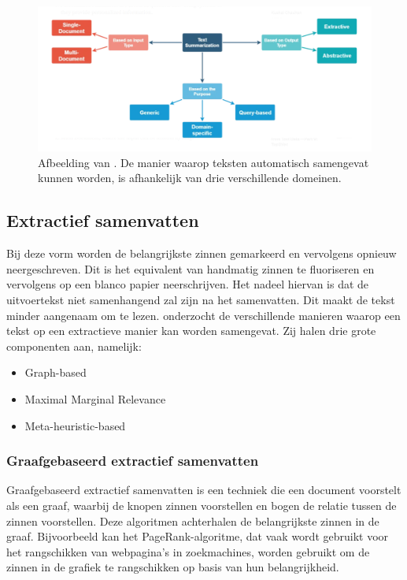 \begin{figure}
	\includegraphics{img/summarization-mindmap.png}
	\caption{Afbeelding van \textcite{Chauchan2018}. De manier waarop teksten automatisch samengevat kunnen worden, is afhankelijk van drie verschillende domeinen.}
\end{figure}

\subsection{Extractief samenvatten}


Bij deze vorm worden de belangrijkste zinnen gemarkeerd en vervolgens opnieuw neergeschreven.  Dit is het equivalent van handmatig zinnen te fluoriseren en vervolgens op een blanco papier neerschrijven. Het nadeel hiervan is dat de uitvoertekst niet samenhangend zal zijn na het samenvatten. Dit maakt de tekst minder aangenaam om te lezen. \textcite{Verma2020} onderzocht de verschillende manieren waarop een tekst op een extractieve manier kan worden samengevat. Zij halen drie grote componenten aan, namelijk:

\begin{itemize}
	\item Graph-based
	\item Maximal Marginal Relevance
	\item Meta-heuristic-based
\end{itemize}

\subsubsection{Graafgebaseerd extractief samenvatten}

Graafgebaseerd extractief samenvatten is een techniek die een document voorstelt als een graaf, waarbij de knopen zinnen voorstellen en bogen de relatie tussen de zinnen voorstellen. Deze algoritmen achterhalen de belangrijkste zinnen in de graaf. Bijvoorbeeld kan het PageRank-algoritme, dat vaak wordt gebruikt voor het rangschikken van webpagina's in zoekmachines, worden gebruikt om de zinnen in de grafiek te rangschikken op basis van hun belangrijkheid.

